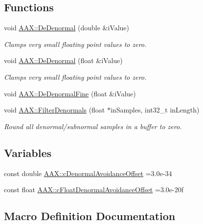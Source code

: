 \subsection*{Functions}
\begin{DoxyCompactItemize}
\item 
void \hyperlink{a00288_aaf103dc75b68b6c4f6792dd26f9b4fd0}{A\+A\+X\+::\+De\+Denormal} (double \&i\+Value)
\begin{DoxyCompactList}\small\item\em Clamps very small floating point values to zero. \end{DoxyCompactList}\item 
void \hyperlink{a00288_aedfd1762f559291ceddd53f8ce8862a5}{A\+A\+X\+::\+De\+Denormal} (float \&i\+Value)
\begin{DoxyCompactList}\small\item\em Clamps very small floating point values to zero. \end{DoxyCompactList}\item 
void \hyperlink{a00288_ac52b6214a1de32e59b90ddbc1878e515}{A\+A\+X\+::\+De\+Denormal\+Fine} (float \&i\+Value)
\item 
void \hyperlink{a00288_a73dd9a17abecc28625c4d34279e4534f}{A\+A\+X\+::\+Filter\+Denormals} (float $\ast$in\+Samples, int32\+\_\+t in\+Length)
\begin{DoxyCompactList}\small\item\em Round all denormal/subnormal samples in a buffer to zero. \end{DoxyCompactList}\end{DoxyCompactItemize}
\subsection*{Variables}
\begin{DoxyCompactItemize}
\item 
const double \hyperlink{a00288_a5c2e1bff2891a4b11252759e152cf520}{A\+A\+X\+::c\+Denormal\+Avoidance\+Offset} =3.\+0e-\/34
\item 
const float \hyperlink{a00288_ae3a66eee97cfe006ffbf11f901ddd286}{A\+A\+X\+::c\+Float\+Denormal\+Avoidance\+Offset} =3.\+0e-\/20f
\end{DoxyCompactItemize}


\subsection{Macro Definition Documentation}
\hypertarget{a00201_aebb709c3232ca8ebe6ea366ca8391dad}{}
